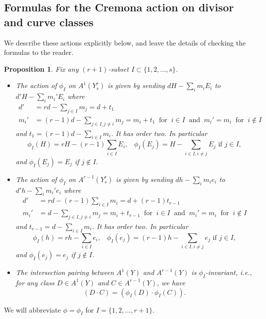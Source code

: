 \documentclass[12pt]{article}
\numberwithin{equation}{section}
\newtheorem{proposition}[equation]{Proposition}
\numberwithin{equation}{section}
\numberwithin{subeq}{equation}
\begin{document}
\subsection{Formulas for the Cremona action on divisor and curve classes}
We describe these actions explicitly below, and leave the details of checking the formulas to the reader.

\begin{proposition}\label{CremonaAY}
Fix any $(r+1)$-subset $I \subset \{1,2,\ldots, s\}$.
\begin{itemize}
\item[(a)]
The action of $\phi_I$ on $A^1(Y^r_s)$ is given by sending $dH-\sum_i m_i E_i$ to $d'H-\sum_i m_i' E_i$ where
\begin{align*}
d' &= rd - \sum_{j\in I}m_j = d+t_1 \\
m_i' &= (r-1)d - \sum_{j\in I, j\neq i} m_j = m_i + t_1 \;\;\text{for}\;\; i \in I \;\;\text{and}\;\;
m_i' = m_i \;\;\text{for}\;\; i \notin I
\end{align*}
and $t_1 = (r-1)d - \sum_{i \in I} m_i$.  It has order two.
In particular
\[
\phi_I(H) = rH-(r-1)\sum_{i\in I} E_i, \;\;\;
\phi_I(E_j) = H-\sum_{i\in I, i\neq j} E_j \text{ if } j\in I,
\]
and $\phi_I(E_j) = E_j$ if $j \notin I$.

\item[(b)]
The action of $\phi_I$ on $A^{r-1}(Y^r_s)$ is given by sending $dh-\sum_i m_i e_i$ to $d'h-\sum_i m_i' e_i$ where
\begin{align*}
d' &= rd-(r-1)\sum_{i\in I} m_i =d+(r-1)t_{r-1} \\
m_i' &= d - \sum_{j\in I, j \neq i} m_j = m_i + t_{r-1} \;\;\text{for}\;\; i \in I \;\;\text{and}\;\;
m_i' = m_i \;\;\text{for}\;\; i \notin I
\end{align*}
and $t_{r-1} = d - \sum_{i \in I} m_i$.  It has order two.
In particular
\[
\phi_I(h) = rh-\sum_{i\in I} e_i,\;\;\;
\phi_I(e_j) = (r-1)h-\sum_{i\in I, i\neq j} e_j \text{ if } j\in I,
\]
and $\phi_I(e_j) = e_j$ if $j \notin I$.

\item[(c)]
The intersection pairing between $A^1(Y)$ and $A^{r-1}(Y)$ is $\phi_I$-invariant, i.e.,
for any class $D \in A^1(Y)$ and $C \in A^{r-1}(Y)$, we have
\[
(D \cdot C) = (\phi_I(D) \cdot \phi_I(C)).
\]
\end{itemize}
\end{proposition}

We will abbreviate $\phi = \phi_I$ for $I = \{1,2,\ldots,r+1\}$.
\end{document}
